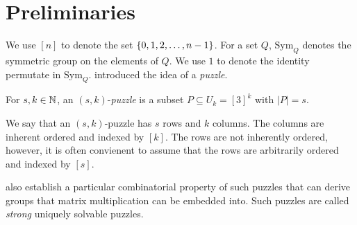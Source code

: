 \documentclass[11pt]{article}
\newcommand\sse{\subseteq}
\newcommand\Sym[1]{\ensuremath{\mathrm{Sym}_{#1}}}
\begin{document}
\section{Preliminaries}
\label{sec:prelim}

\newcommand\ordset[1]{\ensuremath{[#1]}}

We use $\ordset{n}$ to denote the set $\left\{ 0,1,2,\ldots, n-1 \right\}$.  For
a set $Q$, $\Sym{Q}$ denotes the symmetric group on the elements of
$Q$.  We use $1$ to denote the identity permutate in
$\Sym{Q}$. \cite{cksu05} introduced the idea of a \emph{puzzle}.

\begin{definition}[Puzzle]
  For $s, k \in \mathbb{N}$, an $(s,k)$-\emph{puzzle} is a
  subset $P \sse U_k = \ordset{3}^k$ with $|P| = s$.
\end{definition}

We say that an $(s,k)$-puzzle has $s$ rows and $k$ columns.  The
columns are inherent ordered and indexed by $\ordset{k}$.  The rows
are not inherently ordered, however, it is often convienent to assume
that the rows are arbitrarily ordered and indexed by $\ordset{s}$.

\cite{cksu05} also establish a particular combinatorial property of
such puzzles that can derive groups that matrix multiplication can be
embedded into.  Such puzzles are called \emph{strong} uniquely
solvable puzzles.


\end{document}
